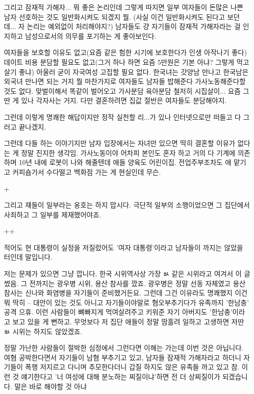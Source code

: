 \begin{enumerate}
  
    그리고 잠재적 가해자... 뭐 좋은 논리인데 그렇게 따지면 일부 여자들이 돈많은 나쁜 남자 선호하는 것도 일반화시켜도 되겠지 뭘.
    (사실 이건 일반화시켜도 된다고 보던데... 자 논리는 예외없이 처리해야지?)
    남자들도 걍 자기들이 잠재적 가해자라는 걸 인지하고 남성으로서의 의무를 포기하는 게 좋아보인다.
    \vspace{5mm}

    여자들을 보호할 이유도 없고(요즘 같은 험한 시기에 보호한다가 인생 아작나기 좋다)
    데이트 비용 분담할 필요도 없고(그거 하나 하면 요즘 5만원은 기본 아냐? 그렇게 먹고살기 좋냐)
    아울러 굳이 자국여성 고집할 필요 없다. 한국녀는 갓양남 만나고 한국남은 외국녀 만나면 되는 거지 뭘
    마찬가지로 여자들도 남자들 밥해준다 가사노동해준다할 것도 없다. 맞벌이해서 똑같이 벌어오고 가사분담 육아분담 철저히
    시집살이... 요즘 그딴 게 있나 각자사는 거지. 다만 결혼하려면 집값 절반은 여자들도 분담해야지.
    \vspace{5mm}
   
  
    그런데 이렇게 명쾌한 해답이지만 정작 실천할 리...가 있나
    인터넷으로만 떠들고 다 그러고 끝나겠지.
  
    \vspace{5mm}
  
    그런데 다들 하는 이야기지만 남자 입장에서는 자녀만 있으면 딱히 결혼할 이유가 없다는 게 정말 진지한 생각임.
    가사노동이야 어차피 본인도 혼자 하고 거의 다 기계에 의존하며 10년 내에 로봇이 나와 해줄텐데
    애들 양육도 어린이집. 전업주부조차도 애 맡기고 커피숍가서 수다떨고 백화점 가는 게 현실인데 무슨.
  
    \vspace{5mm}
  
  
  
   +
  
   그리고 쟤들이 일부라는 옹호는 하지 맙시다. 극단적 일부의 소행이었으면 그 집단에서 사죄하고 그 일부를 제재했어야죠.
   \vspace{5mm}
   
  
   ++
  
   적어도 현 대통령이 실정을 저질렀어도 '여자 대통령'이라고 남자들이 까지는 않았을 터인데 말입니다.
   \vspace{5mm}
  
  
   저는 문제가 있으면 그냥 깝니다. 한국 시위역사상 가장 ㅄ 같은 시위라고 여겨서 이 글 썼음.
   그 전까지는 광우병 시위, 용산 참사를 깠죠. 광우병은 정말 선동 자체였고 용산 참사는 신나와 화염병을 자기들이 준비했거든요.
   그런데 그건 이유라도 명쾌했지 이건 뭐 딱히 -- 대안이 있는 것도 아니고 자기들이야말로 혐오부추기다가 유족까지 '한남충' 공격 으휴.
   이런 사람들이 뼈빠지게 먹여살려주고 키워준 자기 아버지도 '한남충'이라고 보고 있을 게 뻔하고.
   무엇보다 저 집단 애들이 정말 땀흘려 일하고 고생하면 저딴 ㅄ 시위는 하지도 않았겠죠.
   \vspace{5mm}
  
  
   정말 가난한 사람들이 절박한 심정에서 그런다면 이해는 가는데 이번 것은 아닙니다.
   여혐 공박한다면서 자기들이 남혐 부추기고 있고, 남자들 잠재적 가해자라고 하더니 자기들이 폭행 저지르고 다니며
   추모한다더니 갑질 하지도 않은 유족들 까고 있고 참.
   이런 것 얘기한다고 '너 여성에 대해 분노하는 찌질이냐'하면 전 더 상찌질이가 되겠습니다. 말은 바로 해야할 것 아냐
\end{enumerate}
